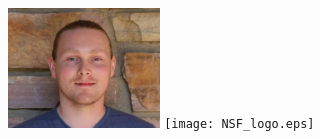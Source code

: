 \documentclass[landscape,final]{baposter}
\newcommand{\headshotsize}{1.25in}
\begin{document}
\begin{poster}
{{\begin{minipage}{4.5in}
\hspace{.5cm}
\includegraphics[height=\headshotsize, trim={3cm, 0cm, 3cm, 0cm}, clip=true]{headshot_sage}
\hspace{.5cm}
\texttt{[image: NSF\_logo.eps]}
\end{minipage}}}


     \newlength{\leftimgwidth}
     \setlength{\leftimgwidth}{0.78em+8.0em}



\end{poster}
\end{document}
